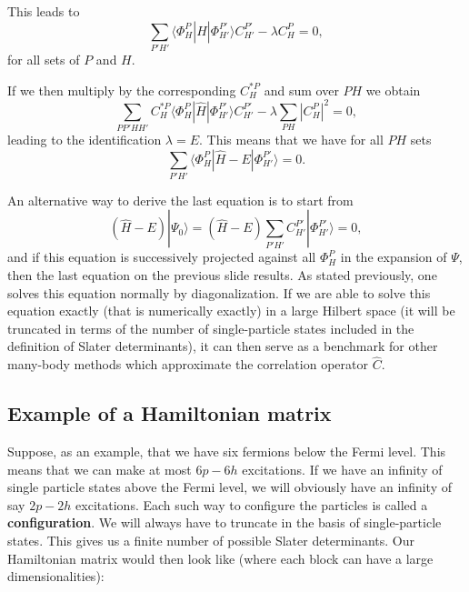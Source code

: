 \documentclass[%
twoside,                 %
final,                   %
10pt]{article}
\begin{document}
This leads to 
\[
\sum_{P'H'}\langle \Phi_H^P | \hat{H} |\Phi_{H'}^{P'} \rangle C_{H'}^{P'}-\lambda C_H^{P}=0,
\]
for all sets of $P$ and $H$.

If we then multiply by the corresponding $C_H^{*P}$ and sum over $PH$ we obtain
\[ 
\sum_{PP'HH'}C_H^{*P}\langle \Phi_H^P | \hat{H} |\Phi_{H'}^{P'} \rangle C_{H'}^{P'}-\lambda\sum_{PH}|C_H^P|^2=0,
\]
leading to the identification $\lambda = E$. This means that we have for all $PH$ sets
\begin{equation}
\sum_{P'H'}\langle \Phi_H^P | \hat{H} -E|\Phi_{H'}^{P'} \rangle = 0. \label{eq:fullci}
\end{equation}



An alternative way to derive the last equation is to start from 
\[
(\hat{H} -E)|\Psi_0\rangle = (\hat{H} -E)\sum_{P'H'}C_{H'}^{P'}|\Phi_{H'}^{P'} \rangle=0, 
\]
and if this equation is successively projected against all $\Phi_H^P$ in the expansion of $\Psi$, then the last equation on the previous slide
results.   As stated previously, one solves this equation normally by diagonalization. If we are able to solve this equation exactly (that is
numerically exactly) in a large Hilbert space (it will be truncated in terms of the number of single-particle states included in the definition
of Slater determinants), it can then serve as a benchmark for other many-body methods which approximate the correlation operator
$\hat{C}$.  


\subsection{Example of a Hamiltonian matrix}

Suppose, as an example, that we have six fermions below the Fermi level.
This means that we can make at most $6p-6h$ excitations. If we have an infinity of single particle states above the Fermi level, we will obviously have an infinity of say $2p-2h$ excitations. Each such way to configure the particles is called a \textbf{configuration}. We will always have to truncate in the basis of single-particle states.
This gives us a finite number of possible Slater determinants. Our Hamiltonian matrix would then look like (where each block can have a large dimensionalities):
\end{document}
